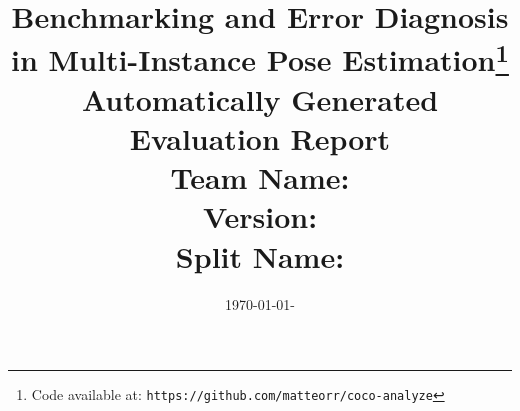 \documentclass[10pt,onecolumn,letterpaper]{article}
\begin{document}
\title{Benchmarking and Error Diagnosis in Multi-Instance Pose Estimation\footnote{Code available at: \texttt{https://github.com/matteorr/coco-analyze}}\\
Automatically Generated Evaluation Report\\[1.5ex]
\textbf{Team Name:}  \texttt{}\\[1.5ex]
\textbf{Version:}    \texttt{}\\[1.5ex]
\textbf{Split Name:} \texttt{}}
\date{\today - \currenttime}
\maketitle


\end{document}
